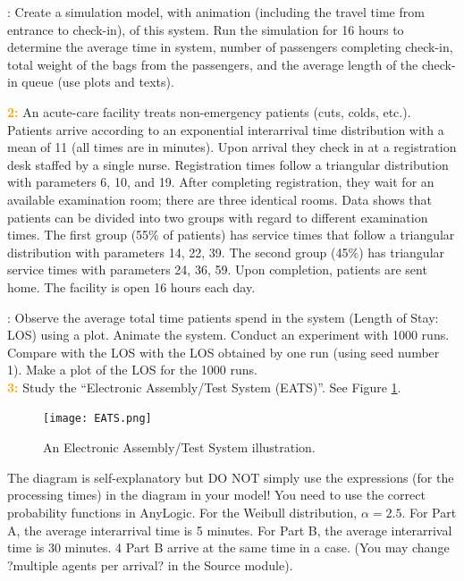 \documentclass{article}
\begin{document}
\textit{\color{cyan}{Requirements}}: Create a simulation model, with animation (including the travel time from entrance to check-in), of this system. Run the simulation for 16 hours to determine the average time in system, number of passengers completing check-in, total weight of the bags from the passengers, and the average length of the check-in queue (use plots and texts).

\vskip 0.3in

\textcolor{orange}{\bf 2:} An acute-care facility treats non-emergency patients (cuts, colds, etc.). Patients arrive according to an exponential interarrival time distribution with a mean of 11 (all times are in minutes). Upon arrival they check in at a registration desk staffed by a single nurse. Registration times follow a triangular distribution with parameters 6, 10, and 19. After completing registration, they wait for an available examination room; there are three identical rooms. Data shows that patients can be divided into two groups with regard to different examination times. The first group (55\% of patients) has service times that follow a triangular distribution with parameters 14, 22, 39. The second group (45\%) has triangular service times with parameters 24, 36, 59. Upon completion, patients are sent home. The facility is open 16 hours each day. 
\vskip 0.3in

\textit{\color{cyan}{Requirements}}:  Observe the average total time patients spend in the system (Length of Stay: LOS) using a plot. Animate the system. Conduct an experiment with 1000 runs. Compare with the LOS with the LOS obtained by one run (using seed number 1). Make a plot of the LOS for the 1000 runs.\\

\textcolor{orange}{\bf 3:} Study the ``Electronic Assembly/Test System (EATS)''. See Figure \ref{fig:eats}. \\

\begin{figure} [htbp]
\centering
\texttt{[image: EATS.png]}
\caption{\label{fig:eats} An Electronic Assembly/Test System illustration.}
\end{figure}

The diagram is self-explanatory but DO NOT simply use the expressions (for the processing times) in the diagram in your model! You need to use the correct probability functions in AnyLogic. For the Weibull distribution, $\alpha=2.5$. For Part A, the average interarrival time is 5 minutes. For Part B, the average interarrival time is 30 minutes. 4 Part B arrive at the same time in a case. (You may change ?multiple agents per arrival? in the Source module). \\
\end{document}
